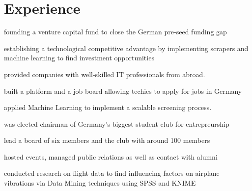 \documentclass[]{deedy-resume-openfont}
\begin{document}
\begin{minipage}[t]{0.66\textwidth} 


\section{Experience}
\vspace{\topsep} %
\begin{tightemize}
\item founding a venture capital fund to close the German pre-seed funding gap
\item establishing a technological competitive advantage by implementing scrapers and machine learning to find investment opportunities
\end{tightemize}
\sectionsep

\begin{tightemize}
\item provided companies with well-skilled IT professionals from abroad.
\item built a platform and a job board allowing techies to apply for jobs in Germany
\item applied Machine Learning to implement a scalable screening process.
\end{tightemize}
\sectionsep

\begin{tightemize}
\item was elected chairman of Germany's biggest student club for entrepreurship
\item lead a board of six members and the club with around 100 members
\item hosted events, managed public relations as well as contact with alumni
\end{tightemize}
\sectionsep

\begin{tightemize}
\item conducted research on flight data to find influencing factors on airplane vibrations via Data Mining techniques using SPSS and KNIME
\end{tightemize}
\sectionsep


\end{minipage}
\end{document}
